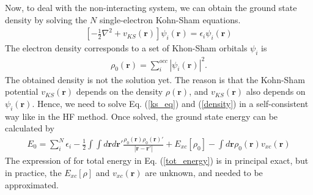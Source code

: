 Now, to deal with the non-interacting system, we can obtain the ground state density by solving the $N$ single-electron Kohn-Sham equations.
	\begin{equation}
	\label{ks_eq}
	\begin{aligned}
        \left[ -\frac{1}{2}\nabla^2 + v_{KS}(\textbf{r})  \right] \psi_i(\textbf{r}) = \epsilon_i \psi_i(\textbf{r})
    \end{aligned}
	\end{equation}
The electron density corresponds to a set of Khon-Sham orbitals {$\psi_i$} is
	\begin{equation}
	\label{density}
	\begin{aligned}
        \rho_0(\textbf{r}) = \sum_{i}^{occ} \left| \psi_i(\textbf{r}) \right|^2.
    \end{aligned}
	\end{equation}
The obtained density is not the solution yet. The reason is that the Kohn-Sham potential $v_{KS}(\textbf{r})$ depends on the density $\rho(\textbf{r})$, and $v_{KS}(\textbf{r})$ also depends on $\psi_i(\textbf{r})$. Hence, we need to solve Eq. (\ref{ks_eq}) and (\ref{density}) in a self-consistent way like in the HF method. Once solved, the ground state energy can be calculated by
	\begin{equation}
	\label{tot_energy}
	\begin{aligned}
        E_0 = \sum_{i}^N \epsilon_i - \frac{1}{2} \int \int d\textbf{r}d\textbf{r}' \frac{\rho_0(\textbf{r}) \rho_0(\textbf{r})'} {\left|\textbf{r} - \textbf{r}' \right|} + E_{xc}[\rho_0] - \int d\textbf{r} \rho_0(\textbf{r}) v_{xc}(\textbf{r})
    \end{aligned}
	\end{equation}
The expression of for total energy in Eq. (\ref{tot_energy}) is in principal exact, but in practice, the $E_{xc}[\rho]$ and $v_{xc}(\textbf{r})$ are unknown, and needed to be approximated.

